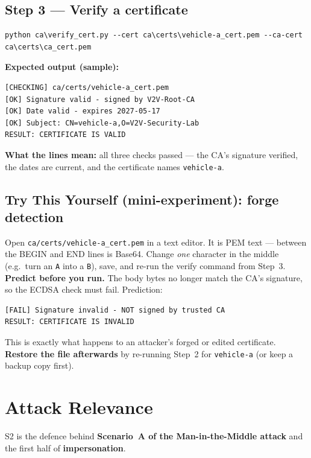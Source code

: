 \documentclass[11pt,a4paper]{report}
\begin{document}
\subsection{Step 3 --- Verify a certificate}
\begin{lstlisting}[style=term]
python ca\verify_cert.py --cert ca\certs\vehicle-a_cert.pem --ca-cert ca\certs\ca_cert.pem
\end{lstlisting}
\textbf{Expected output (sample):}
\begin{lstlisting}[style=term]
[CHECKING] ca/certs/vehicle-a_cert.pem
[OK] Signature valid - signed by V2V-Root-CA
[OK] Date valid - expires 2027-05-17
[OK] Subject: CN=vehicle-a,O=V2V-Security-Lab
RESULT: CERTIFICATE IS VALID
\end{lstlisting}
\textbf{What the lines mean:} all three checks passed --- the CA's signature
verified, the dates are current, and the certificate names \texttt{vehicle-a}.

\subsection{Try This Yourself (mini-experiment): forge detection}
Open \texttt{ca/certs/vehicle-a\_cert.pem} in a text editor. It is PEM text ---
between the BEGIN and END lines is Base64. Change \emph{one} character in the
middle (e.g.\ turn an \texttt{A} into a \texttt{B}), save, and re-run the verify
command from Step~3.\\
\textbf{Predict before you run.} The body bytes no longer match the CA's
signature, so the ECDSA check must fail. Prediction:
\begin{lstlisting}[style=term]
[FAIL] Signature invalid - NOT signed by trusted CA
RESULT: CERTIFICATE IS INVALID
\end{lstlisting}
This is exactly what happens to an attacker's forged or edited certificate.
\textbf{Restore the file afterwards} by re-running Step~2 for \texttt{vehicle-a}
(or keep a backup copy first).

\section{Attack Relevance}

S2 is the defence behind \textbf{Scenario~A of the Man-in-the-Middle attack} and
the first half of \textbf{impersonation}.
\end{document}

